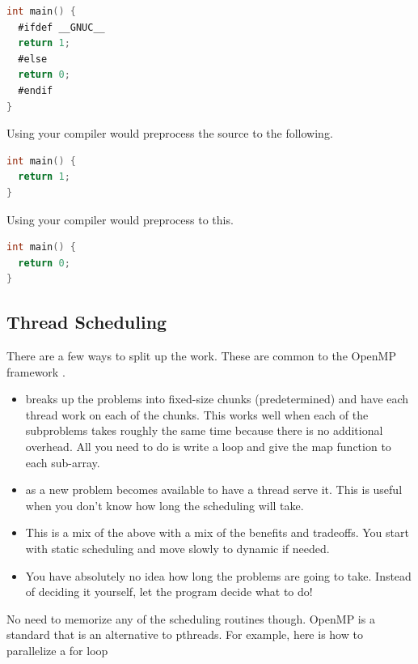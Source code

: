 \begin{lstlisting}[language=C]
int main() {
  #ifdef __GNUC__
  return 1;
  #else
  return 0;
  #endif
}
\end{lstlisting}

Using  your compiler would preprocess the source to the following.

\begin{lstlisting}[language=C]
int main() {
  return 1;
}
\end{lstlisting}

Using  your compiler would preprocess to this.

\begin{lstlisting}[language=C]
int main() {
  return 0;
}
\end{lstlisting}


\subsection{Thread Scheduling}

There are a few ways to split up the work.
These are common to the OpenMP framework \cite{silberschatz2005operating}.

\begin{itemize}
\item {} breaks up the problems into fixed-size chunks (predetermined) and have each thread work on each of the chunks.
  This works well when each of the subproblems takes roughly the same time because there is no additional overhead.
  All you need to do is write a loop and give the map function to each sub-array.
\item {} as a new problem becomes available to have a thread serve it.
  This is useful when you don't know how long the scheduling will take.
\item {} This is a mix of the above with a mix of the benefits and tradeoffs.
  You start with static scheduling and move slowly to dynamic if needed.
\item {} You have absolutely no idea how long the problems are going to take.
  Instead of deciding it yourself, let the program decide what to do!
\end{itemize}

No need to memorize any of the scheduling routines though.
OpenMP is a standard that is an alternative to pthreads.
For example, here is how to parallelize a for loop

